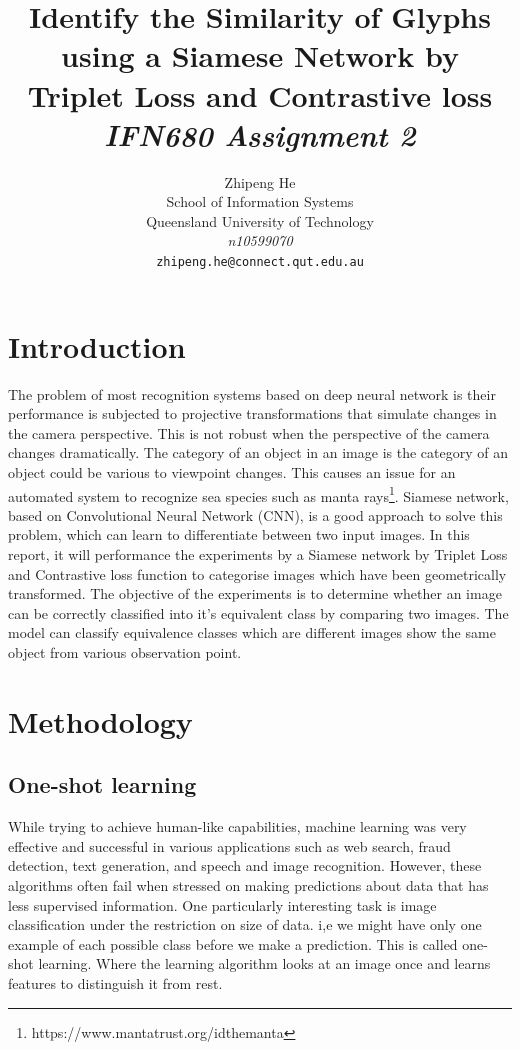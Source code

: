 \documentclass{article}
\title{Identify the Similarity of Glyphs using a Siamese Network by Triplet Loss and Contrastive loss \\
{\sl \Large IFN680 Assignment 2}}
\author{
 Zhipeng He \\
  School of Information Systems\\
  Queensland University of Technology\\
  \textit{n10599070} \\
  \texttt{zhipeng.he@connect.qut.edu.au} \\
}
\begin{document}
\maketitle

\vspace{5em}

\section{Introduction}

The problem of most recognition systems based on deep neural network is their performance is subjected to projective transformations that simulate changes in the camera perspective. This is not robust when the perspective of the camera changes dramatically. The category of an object in an image is the category of an object could be various to viewpoint changes. This causes an issue for an automated system to recognize sea species such as manta rays\footnote{https://www.mantatrust.org/idthemanta}. Siamese network, based on Convolutional Neural Network (CNN), is a good approach to solve this problem, which can learn to differentiate between two input images. In this report, it will performance the experiments by a Siamese network by Triplet Loss and Contrastive loss function to categorise images which have been geometrically transformed. The objective of the experiments is to determine whether an image can be correctly classified into it’s equivalent class by comparing two images. The model can classify equivalence classes which are different images show the same object from various observation point.


\section{Methodology}

\subsection{One-shot learning}

While trying to achieve human-like capabilities, machine learning was very effective and successful in various applications such as web search, fraud detection, text generation, and speech and image recognition. However, these algorithms often fail when stressed on making predictions about data that has less supervised information. One particularly interesting task is image classification under the restriction on size of data. i,e we might have only one example of each possible class before we make a prediction. This is called one-shot learning. Where the learning algorithm looks at an image once and learns features to distinguish it from rest.
\end{document}
